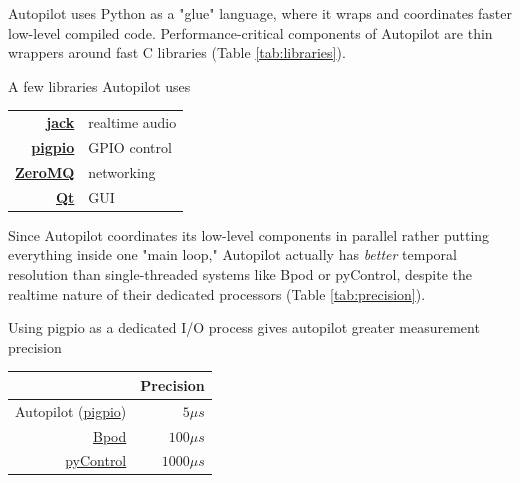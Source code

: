 Autopilot uses Python as a "glue" language, where it wraps and coordinates faster low-level compiled code\citep{vanrossumGlueItAll1998}.  
Performance-critical components of Autopilot are thin wrappers around fast C libraries (Table \ref{tab:libraries}).

\begin{margintable}[0.1cm]
\caption{A few libraries Autopilot uses}
\label{tab:libraries}
\noindent\begin{tabularx}{\linewidth}{Rl}
\toprule
 \textbf{\href{http://jackaudio.org/}{jack}} & realtime audio \\
 \textbf{\href{http://abyz.me.uk/rpi/pigpio/index.html}{pigpio}} & GPIO control \\
 \textbf{\href{http://zeromq.org/}{ZeroMQ}} & networking \\
 \textbf{\href{https://www.qt.io/}{Qt}} & GUI \\
 \bottomrule
\end{tabularx}

\end{margintable}

Since Autopilot coordinates its low-level components in parallel rather putting everything inside one "main loop," Autopilot actually has \textit{better} temporal resolution than  single-threaded systems like Bpod or pyControl, despite the realtime nature of their dedicated processors (Table \ref{tab:precision}).

\begin{margintable}
\caption{Using pigpio as a dedicated I/O process gives autopilot greater measurement precision}
\label{tab:precision}
\noindent\begin{tabularx}{\linewidth}{rR}\toprule
& Precision \\
\midrule
Autopilot (\href{http://abyz.me.uk/rpi/pigpio/pigpiod.html}{pigpio}) & $5\mu s$ \\
\href{https://github.com/sanworks/Bpod_StateMachine_Firmware/blob/059d1e9195f5bb7d0d5cd7b33f56342eb5a3a55c/Dev/StateMachineFirmware/StateMachineFirmware.ino\#L196}{Bpod} & $100\mu s$ \\
\href{https://bitbucket.org/takam/pycontrol/src/c678552ac57be2108a5461e0c5f8051ce7d3816a/pyControl/framework.py?at=default\&fileviewer=file-view-default\#framework.py-278}{pyControl} & $1000\mu s$ \\
\bottomrule
\end{tabularx}

\end{margintable}

